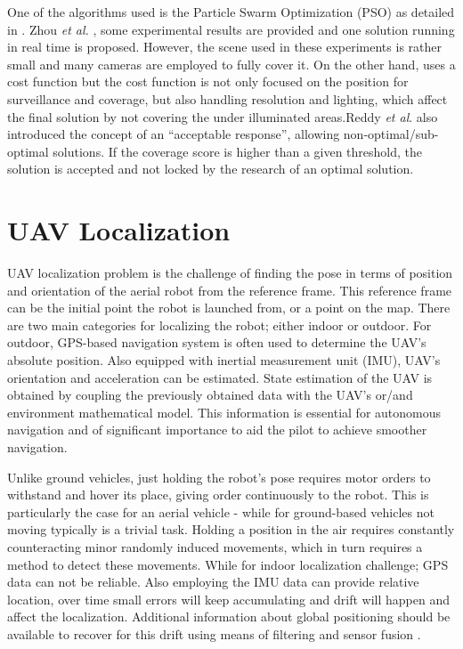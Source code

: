  One of the algorithms used is the Particle Swarm Optimization (PSO) as detailed in \cite{c10,c11}. Zhou \textit{et al.} \cite{c10}, some experimental results are provided and one solution running in real time is proposed. However, the scene used in these experiments is rather small and many cameras are employed to fully cover it.  On the other hand, \cite{c11} uses a cost function but the cost function is not only focused on the position for surveillance and coverage, but also handling resolution and lighting, which affect the final solution by not covering the under illuminated areas.Reddy \textit{et al}. \cite{c11} also introduced the concept of an “acceptable response”, allowing non-optimal/sub-optimal solutions. If the coverage score is higher than a given threshold, the solution is accepted and not locked by the research of an optimal solution. 
 
 \section{UAV Localization} \label{localization_Back}
 
UAV localization problem is the challenge of finding the pose in terms of position and orientation of the aerial robot from the reference frame. This reference frame can be the initial point the robot is launched from, or a point on the map. There are two main categories for localizing the robot; either indoor or outdoor. For outdoor, GPS-based navigation system is often used to determine the UAV’s absolute position. Also equipped with inertial measurement unit (IMU), UAV's orientation and acceleration can be estimated. State estimation of the UAV is obtained by coupling the previously obtained data with the UAV's or/and environment mathematical model. This information is essential for autonomous navigation and of significant importance to aid the pilot to achieve smoother navigation.

 Unlike ground vehicles, just holding the robot's pose requires motor orders to withstand and hover its place, giving order continuously to the robot. This is particularly the case for an aerial vehicle - while for ground-based vehicles not moving typically is a trivial task. Holding a position in the air requires constantly counteracting minor randomly induced movements, which in turn requires a method to detect these movements.
While for indoor localization challenge; GPS data can not be reliable. Also employing the IMU data can provide relative location, over time small errors will keep accumulating and drift will happen and affect the localization. Additional information about global positioning should be available to recover for this drift using means of filtering and sensor fusion \cite{benini2013imu}. 

